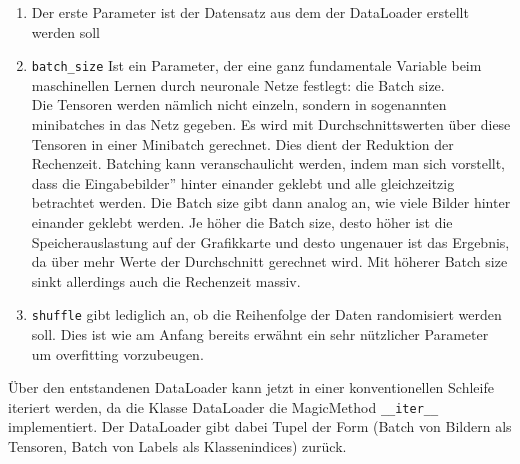 \documentclass{article}
\begin{document}
\begin{enumerate}
	\item Der erste Parameter ist der Datensatz aus dem der DataLoader erstellt werden soll
	\item \texttt{batch_size} Ist ein Parameter, der eine ganz fundamentale Variable beim maschinellen Lernen durch neuronale Netze festlegt: die Batch size.\\
	Die Tensoren werden nämlich nicht einzeln, sondern in sogenannten minibatches in das Netz gegeben. Es wird mit Durchschnittswerten über diese Tensoren in einer Minibatch gerechnet. Dies dient der Reduktion der Rechenzeit. Batching kann veranschaulicht werden, indem man sich vorstellt, dass die \glqq Eingabebilder'' hinter einander geklebt und alle gleichzeitzig betrachtet werden. Die Batch size gibt dann analog an, wie viele Bilder hinter einander geklebt werden. Je höher die Batch size, desto höher ist die Speicherauslastung auf der Grafikkarte und desto ungenauer ist das Ergebnis, da über mehr Werte der Durchschnitt gerechnet wird. Mit höherer Batch size sinkt allerdings auch die Rechenzeit massiv.
	\item \texttt{shuffle} gibt lediglich an, ob die Reihenfolge der Daten randomisiert werden soll. Dies ist wie am Anfang bereits erwähnt ein sehr nützlicher Parameter um overfitting vorzubeugen.
\end{enumerate}
Über den entstandenen DataLoader kann jetzt in einer konventionellen Schleife iteriert werden, da die Klasse DataLoader die MagicMethod \texttt{__iter__} implementiert. Der DataLoader gibt dabei Tupel der Form (Batch von Bildern als Tensoren, Batch von Labels als Klassenindices) zurück.
\end{document}
